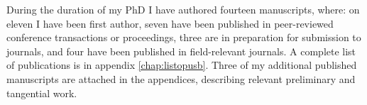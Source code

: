 During the duration of my PhD I have authored fourteen manuscripts, where: on eleven I have been first author, seven have been published in peer-reviewed conference transactions or proceedings, three are in preparation for submission to journals, and four have been published in field-relevant journals.
A complete list of publications is in appendix \ref{chap:listopusb}.
Three of my additional published manuscripts are attached in the appendices, describing relevant preliminary and tangential work.
